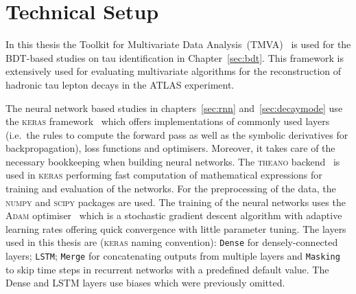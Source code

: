 \section{Technical Setup}
\label{sec:tech_setup}

In this thesis the Toolkit for Multivariate Data Analysis~(TMVA)~\cite{tmva} is
used for the BDT-based studies on tau identification in Chapter~\ref{sec:bdt}.
This framework is extensively used for evaluating multivariate algorithms for
the reconstruction of hadronic tau lepton decays in the ATLAS experiment.

The neural network based studies in chapters~\ref{sec:rnn}
and~\ref{sec:decaymode} use the \textsc{keras} framework~\cite{keras} which
offers implementations of commonly used layers (i.e.\ the rules to compute the
forward pass as well as the symbolic derivatives for backpropagation), loss
functions and optimisers. Moreover, it takes care of the necessary bookkeeping
when building neural networks. The \textsc{theano} backend~\cite{theano} is used
in \textsc{keras} performing fast computation of mathematical expressions for
training and evaluation of the networks. For the preprocessing of the data, the
\textsc{numpy} \cite{numpy} and \textsc{scipy} \cite{scipy} packages are used.
The training of the neural networks uses the \textsc{Adam} optimiser~\cite{adam}
which is a stochastic gradient descent algorithm with adaptive learning rates
offering quick convergence with little parameter tuning. The layers used in this
thesis are (\textsc{keras} naming convention): \texttt{Dense} for
densely-connected layers; \texttt{LSTM}; \texttt{Merge} for concatenating
outputs from multiple layers and \texttt{Masking} to skip time steps in
recurrent networks with a predefined default value. The Dense and LSTM layers
use biases which were previously omitted.

